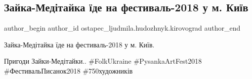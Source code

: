  
 
 
 
 
 
\subsection{Зайка-Медітайка їде на фестиваль-2018 у м. Київ}
\label{sec:30_03_2018.fb.ostapec_ljudmila.hudozhnyk.kirovograd.1.zajka_meditajka_jide_na_festival_v_kyiv}
 
\ifcmt
 author_begin
   author_id ostapec_ljudmila.hudozhnyk.kirovograd
 author_end
\fi

Зайка-Медітайка їде на фестиваль-2018 у м. Київ.

Пригоди Зайки-Медітайки.. \#FolkUkraine \#PysankaArtFest2018 \#ФестивальПисанок2018 \#750художників
